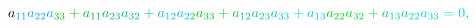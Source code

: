 \documentclass[12pt]{article}
\begin{document}
\begin{displaymath}
{a} _ { \mathcolor[RGB]{0,165,180}{1} \mathcolor[RGB]{0,165,195}{1} } \mathcolor[RGB]{0,165,210}{a} _ { \mathcolor[RGB]{0,165,225}{2} \mathcolor[RGB]{0,165,240}{2} } \mathcolor[RGB]{0,165,255}{a} _ { \mathcolor[RGB]{0,180,0}{3} \mathcolor[RGB]{0,180,15}{3} } \mathcolor[RGB]{0,180,30}{+} \mathcolor[RGB]{0,180,45}{a} _ { \mathcolor[RGB]{0,180,60}{1} \mathcolor[RGB]{0,180,75}{1} } \mathcolor[RGB]{0,180,90}{a} _ { \mathcolor[RGB]{0,180,105}{2} \mathcolor[RGB]{0,180,120}{3} } \mathcolor[RGB]{0,180,135}{a} _ { \mathcolor[RGB]{0,180,150}{3} \mathcolor[RGB]{0,180,165}{2} } \mathcolor[RGB]{0,180,180}{+} \mathcolor[RGB]{0,180,195}{a} _ { \mathcolor[RGB]{0,180,210}{1} \mathcolor[RGB]{0,180,225}{2} } \mathcolor[RGB]{0,180,240}{a} _ { \mathcolor[RGB]{0,180,255}{2} \mathcolor[RGB]{0,195,0}{2} } \mathcolor[RGB]{0,195,15}{a} _ { \mathcolor[RGB]{0,195,30}{3} \mathcolor[RGB]{0,195,45}{3} } \mathcolor[RGB]{0,195,60}{+} \mathcolor[RGB]{0,195,75}{a} _ { \mathcolor[RGB]{0,195,90}{1} \mathcolor[RGB]{0,195,105}{2} } \mathcolor[RGB]{0,195,120}{a} _ { \mathcolor[RGB]{0,195,135}{2} \mathcolor[RGB]{0,195,150}{3} } \mathcolor[RGB]{0,195,165}{a} _ { \mathcolor[RGB]{0,195,180}{3} \mathcolor[RGB]{0,195,195}{3} } \mathcolor[RGB]{0,195,210}{+} \mathcolor[RGB]{0,195,225}{a} _ { \mathcolor[RGB]{0,195,240}{1} \mathcolor[RGB]{0,195,255}{3} } \mathcolor[RGB]{0,210,0}{a} _ { \mathcolor[RGB]{0,210,15}{2} \mathcolor[RGB]{0,210,30}{2} } \mathcolor[RGB]{0,210,45}{a} _ { \mathcolor[RGB]{0,210,60}{3} \mathcolor[RGB]{0,210,75}{2} } \mathcolor[RGB]{0,210,90}{+} \mathcolor[RGB]{0,210,105}{a} _ { \mathcolor[RGB]{0,210,120}{1} \mathcolor[RGB]{0,210,135}{3} } \mathcolor[RGB]{0,210,150}{a} _ { \mathcolor[RGB]{0,210,165}{2} \mathcolor[RGB]{0,210,180}{2} } \mathcolor[RGB]{0,210,195}{a} _ { \mathcolor[RGB]{0,210,210}{3} \mathcolor[RGB]{0,210,225}{3} } \mathcolor[RGB]{0,210,240}{=} \mathcolor[RGB]{0,210,255}{0} \mathcolor[RGB]{0,225,0}{,} \mathcolor[RGB]{0,225,15}{\,
}
\end{displaymath}
\end{document}
